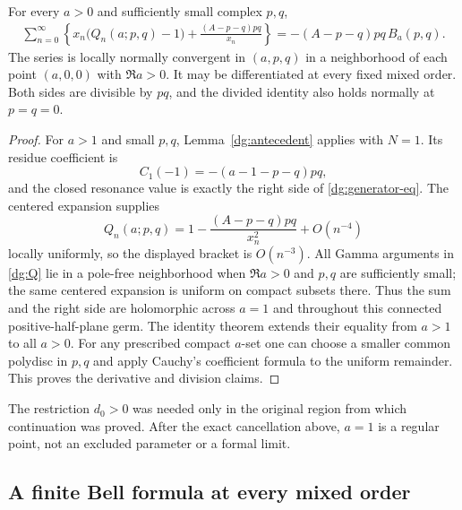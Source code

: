 \begin{theorem}
\label{dg:generator}
For every $a>0$ and sufficiently small complex $p,q$,
\begin{align}
 \sum_{n=0}^{\infty}\left\{
 x_n\bigl(Q_n(a;p,q)-1\bigr)
       +\frac{(A-p-q)pq}{x_n}\right\}
 =-(A-p-q)pq\,B_a(p,q).
 \label{dg:generator-eq}
\end{align}
The series is locally normally convergent in $(a,p,q)$ in a
neighborhood of each point $(a,0,0)$ with $\Re a>0$. It may be
differentiated at every fixed mixed order. Both sides are divisible
by $pq$, and the divided identity also holds normally at $p=q=0$.
\end{theorem}
\begin{proof}
For $a>1$ and small $p,q$, Lemma~\ref{dg:antecedent} applies with
$N=1$. Its residue coefficient is
\[
 C_1(-1)=-(a-1-p-q)pq,
\]
and the closed resonance value is exactly the right side of
\eqref{dg:generator-eq}. The centered expansion supplies
\[
 Q_n(a;p,q)=1-\frac{(A-p-q)pq}{x_n^2}+O(n^{-4})
\]
locally uniformly, so the displayed bracket is $O(n^{-3})$.
All Gamma arguments in \eqref{dg:Q} lie in a pole-free
neighborhood when $\Re a>0$ and $p,q$ are sufficiently small; the
same centered expansion is uniform on compact subsets there.
Thus the sum and the right side are holomorphic across $a=1$ and
throughout this connected positive-half-plane germ. The identity
theorem extends their equality from $a>1$ to all $a>0$.
For any prescribed compact $a$-set one can choose a smaller common
polydisc in $p,q$ and apply Cauchy's coefficient formula to the
uniform remainder. This proves the derivative and division claims.
\end{proof}

The restriction $d_0>0$ was needed only in the original region from
which continuation was proved. After the exact cancellation above,
$a=1$ is a regular point, not an excluded parameter or a formal limit.

\subsection{A finite Bell formula at every mixed order}

